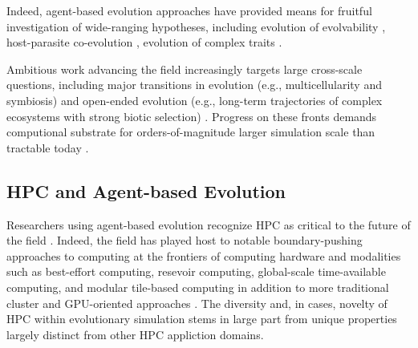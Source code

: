 Indeed, agent-based evolution approaches have provided means for fruitful investigation of wide-ranging hypotheses, including evolution of evolvability \citep{survivaloftheflattest}, host-parasite co-evolution \citep{zaman}, evolution of complex traits \citep{ofrialenski}.

Ambitious work advancing the field increasingly targets large cross-scale questions, including major transitions in evolution (e.g., multicellularity and symbiosis) \citep{goldsby,moreno,sidney} and open-ended evolution (e.g., long-term trajectories of complex ecosystems with strong biotic selection) \citep{grandchallenge,alifeworkshopsTODO}.
Progress on these fronts demands computional substrate for orders-of-magnitude larger simulation scale than tractable today \citep{dishtiny2019TODO,channontodo}.


\subsection{HPC and Agent-based Evolution}


Researchers using agent-based evolution recognize HPC as critical to the future of the field \citep{ackley}.
Indeed, the field has played host to notable boundary-pushing approaches to computing at the frontiers of computing hardware and modalities such as best-effort computing, resevoir computing, global-scale time-available computing, and modular tile-based computing in addition to more traditional cluster and GPU-oriented approaches \citep{morenoconduit,ackleylatestalife,resevoircomputing,ALIEN,RISTOCOMPANYSENTIENT,FLAME}.
The diversity and, in cases, novelty of HPC within evolutionary simulation stems in large part from unique properties largely distinct from other HPC appliction domains.

